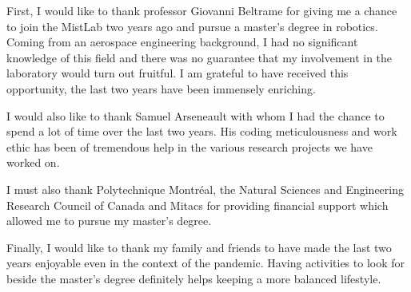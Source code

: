 %
%

First, I would like to thank professor Giovanni Beltrame for giving me a chance to join the MistLab two years ago and pursue a master's degree in robotics. Coming from an aerospace engineering background, I had no significant knowledge of this field and there was no guarantee that my involvement in the laboratory would turn out fruitful. I am grateful to have received this opportunity, the last two years have been immensely enriching.

I would also like to thank Samuel Arseneault with whom I had the chance to spend a lot of time over the last two years. His coding meticulousness and work ethic has been of tremendous help in the various research projects we have worked on.

I must also thank Polytechnique Montréal, the Natural Sciences and Engineering Research Council of Canada and Mitacs for providing financial support which allowed me to pursue my master's degree.

Finally, I would like to thank my family and friends to have made the last two years enjoyable even in the context of the pandemic. Having activities to look for beside the master's degree definitely helps keeping a more balanced lifestyle.
